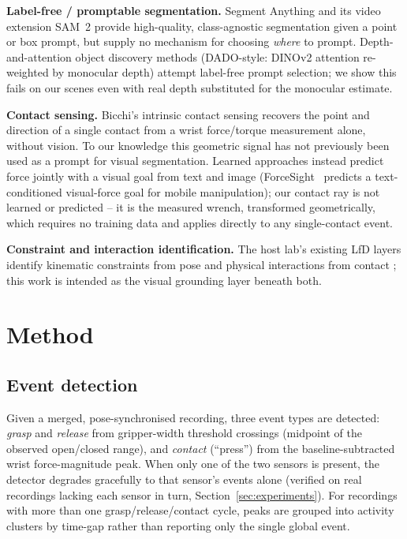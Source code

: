 \documentclass[letterpaper, 10pt, journal, twoside]{IEEEtran}
\begin{document}
\textbf{Label-free / promptable segmentation.} Segment Anything
\cite{kirillov2023sam} and its video extension SAM~2
\cite{ravi2024sam2} provide high-quality, class-agnostic segmentation
given a point or box prompt, but supply no mechanism for choosing
\emph{where} to prompt. Depth-and-attention object discovery methods
(DADO-style: DINOv2 attention re-weighted by monocular depth) attempt
label-free prompt selection; we show this fails on our scenes even with
real depth substituted for the monocular estimate.

\textbf{Contact sensing.} Bicchi's intrinsic contact sensing
\cite{bicchi1990} recovers the point and direction of a single contact
from a wrist force/torque measurement alone, without vision. To our
knowledge this geometric signal has not previously been used as a prompt
for visual segmentation. Learned approaches instead predict force jointly
with a visual goal from text and image (ForceSight~\cite{collins2023forcesight}
predicts a text-conditioned visual-force goal for mobile manipulation);
our contact ray is not learned or predicted -- it is the measured wrench,
transformed geometrically, which requires no training data and applies
directly to any single-contact event.

\textbf{Constraint and interaction identification.} The host lab's
existing LfD layers identify kinematic constraints from pose
\cite{overbeek2025frontiers} and physical interactions from contact
\cite{overbeek2025adrr}; this work is intended as the visual grounding
layer beneath both.

\section{Method}
\label{sec:method}

\subsection{Event detection}

Given a merged, pose-synchronised recording, three event types are
detected: \emph{grasp} and \emph{release} from gripper-width threshold
crossings (midpoint of the observed open/closed range), and
\emph{contact} (``press'') from the baseline-subtracted wrist
force-magnitude peak. When only one of the two sensors is present, the
detector degrades gracefully to that sensor's events alone (verified on
real recordings lacking each sensor in turn, Section~\ref{sec:experiments}).
For recordings with more than one grasp/release/contact cycle, peaks are
grouped into activity clusters by time-gap rather than reporting only the
single global event.
\end{document}
